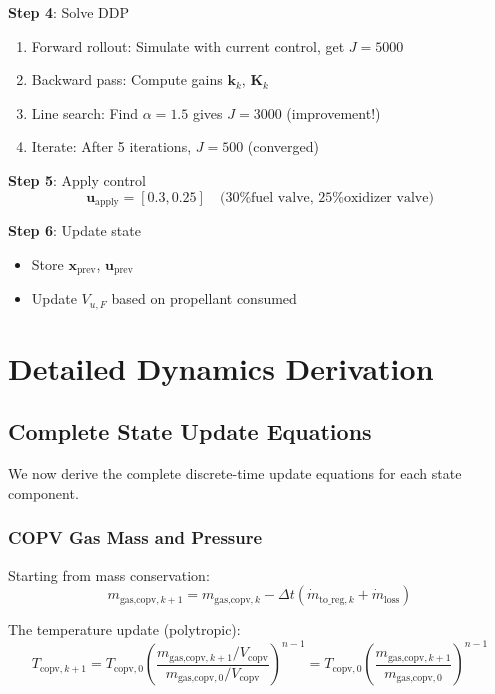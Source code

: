 \documentclass[11pt,a4paper]{article}
\begin{document}
\textbf{Step 4}: Solve DDP
\begin{enumerate}
    \item Forward rollout: Simulate with current control, get $J = 5000$
    \item Backward pass: Compute gains $\mathbf{k}_k$, $\mathbf{K}_k$
    \item Line search: Find $\alpha = 1.5$ gives $J = 3000$ (improvement!)
    \item Iterate: After 5 iterations, $J = 500$ (converged)
\end{enumerate}

\textbf{Step 5}: Apply control
\begin{equation}
\mathbf{u}_{\text{apply}} = [0.3, 0.25] \quad \text{(30\% fuel valve, 25\% oxidizer valve)}
\end{equation}

\textbf{Step 6}: Update state
\begin{itemize}
    \item Store $\mathbf{x}_{\text{prev}}$, $\mathbf{u}_{\text{prev}}$
    \item Update $V_{u,F}$ based on propellant consumed
\end{itemize}

\section{Detailed Dynamics Derivation}

\subsection{Complete State Update Equations}

We now derive the complete discrete-time update equations for each state component.

\subsubsection{COPV Gas Mass and Pressure}

Starting from mass conservation:
\begin{equation}
m_{\text{gas,copv},k+1} = m_{\text{gas,copv},k} - \Delta t \left(\dot{m}_{\text{to\_reg},k} + \dot{m}_{\text{loss}}\right)
\end{equation}

The temperature update (polytropic):
\begin{equation}
T_{\text{copv},k+1} = T_{\text{copv},0} \left(\frac{m_{\text{gas,copv},k+1}/V_{\text{copv}}}{m_{\text{gas,copv},0}/V_{\text{copv}}}\right)^{n-1} = T_{\text{copv},0} \left(\frac{m_{\text{gas,copv},k+1}}{m_{\text{gas,copv},0}}\right)^{n-1}
\end{equation}
\end{document}
